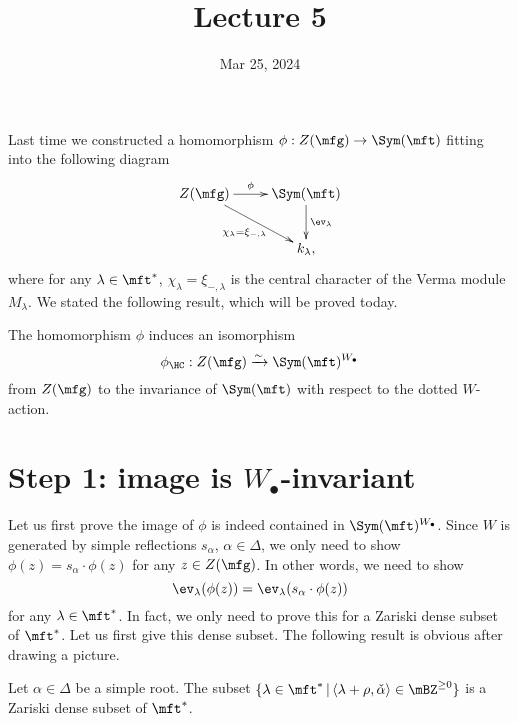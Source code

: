 





\title{Lecture 5}

\date{Mar 25, 2024}

\maketitle


	Last time we constructed a homomorphism $\phi: Z(\mfg) \to \Sym(\mft)$ fitting into the following diagram
	\begin{equation}
		\label{eqn-phi}
		\xymatrix{
			Z(\mfg) 
				\ar[r]^-\phi
				\ar[rd]_-{\chi_\lambda=\xi_{-,\lambda}}
			& \Sym(\mft) \ar[d]^-{\ev_\lambda} \\
			& k_\lambda,
		}
	\end{equation}
	where for any $\lambda\in \mft^*$, $\chi_\lambda=\xi_{-,\lambda}$ is the central character of the Verma module $M_\lambda$. We stated the following result, which will be proved today.

	\begin{thm}
	\label{thm-HC}
		The homomorphism $\phi$ induces an isomorphism
		\[
			\phi_\HC: Z(\mfg)  \xrightarrow{\sim} \Sym(\mft)^{W_\bullet}
		\]
		from $Z(\mfg)$ to the invariance of $\Sym(\mft)$ with respect to the dotted $W$-action.

	\end{thm}

\section{Step 1: image is \texorpdfstring{$W_\bullet$}{W.}-invariant}

	Let us first prove the image of $\phi$ is indeed contained in $\Sym(\mft)^{W_\bullet}$. Since $W$ is generated by simple reflections $s_\alpha$, $\alpha\in \Delta$, we only need to show $\phi(z) = s_\alpha \cdot \phi(z)$ for any $z\in Z(\mfg)$. In other words, we need to show
	\begin{equation}
		\label{eqn-1}
		\ev_\lambda(\phi(z)) = \ev_\lambda(s_\alpha \cdot \phi(z))
	\end{equation}
	for any $\lambda\in \mft^*$. In fact, we only need to prove this for a Zariski dense subset of $\mft^*$. Let us first give this dense subset. The following result is obvious after drawing a picture.

	\begin{lem}
		Let $\alpha\in \Delta$ be a simple root. The subset $\{ \lambda\in \mft^*\,\vert\, \langle \lambda+\rho, \check\alpha \rangle \in \mBZ^{\ge 0} \}$ is a Zariski dense subset of $\mft^*$.
	\end{lem}

